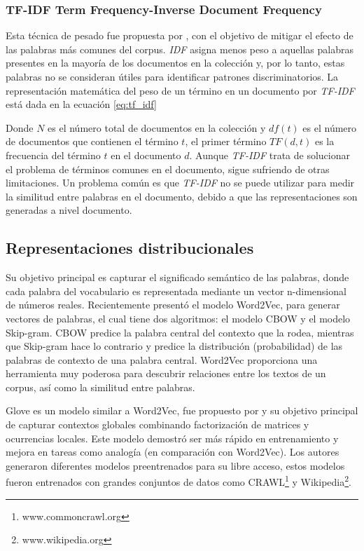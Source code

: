 \subsubsection{TF-IDF Term Frequency-Inverse Document Frequency} Esta técnica de pesado fue propuesta por \citep{jones1972statistical}, con el objetivo de mitigar el efecto de las palabras más comunes del corpus. \textit{IDF} asigna menos peso a aquellas palabras presentes en la mayoría de los documentos en la colección y, por lo tanto, estas palabras no se consideran útiles para identificar patrones discriminatorios. La representación matemática del peso de un término en un documento por \textit{TF-IDF} está dada en la ecuación \ref{eq:tf_idf}



Donde $N$ es el número total de documentos en la colección y $df(t)$ es el número de documentos que contienen el término $t$, el primer término $TF(d,t)$ es la frecuencia del término $t$ en el documento $d$. Aunque \textit{TF-IDF} trata de solucionar el problema de términos comunes en el documento, sigue sufriendo de otras limitaciones. Un problema común es que \textit{TF-IDF} no se puede utilizar para medir la similitud entre palabras en el documento, debido a que las representaciones son generadas a nivel documento.

\subsection{Representaciones distribucionales}
Su objetivo principal es capturar el significado semántico de las palabras, donde cada palabra del vocabulario es representada mediante un vector n-dimensional de números reales. Recientemente \citep{mikolov2013distributed} presentó el modelo Word2Vec, para generar vectores de palabras, el cual tiene dos algoritmos: el modelo CBOW y el modelo Skip-gram. CBOW  predice la palabra central del contexto que la rodea, mientras que Skip-gram hace lo contrario y predice la distribución (probabilidad) de las palabras de contexto de una palabra central. Word2Vec proporciona una herramienta muy poderosa para descubrir relaciones entre los textos de un corpus, así como la similitud entre palabras.

Glove es un modelo similar a Word2Vec, fue propuesto por \citep{pennington2014glove} y su objetivo principal de capturar contextos globales combinando factorización de matrices y ocurrencias locales. Este modelo demostró ser más rápido en entrenamiento y mejora en tareas como analogía (en comparación con Word2Vec). Los autores generaron diferentes modelos preentrenados para su libre acceso, estos modelos fueron entrenados con grandes conjuntos de datos como CRAWL\footnote{www.commoncrawl.org} y Wikipedia\footnote{www.wikipedia.org}.

